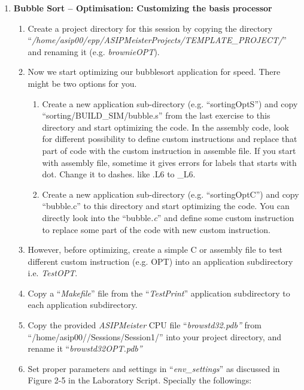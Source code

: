 \documentclass[
]{article}
\begin{document}
\begin{enumerate}
\def\labelenumi{\arabic{enumi}.}
\setcounter{enumi}{3}
\item
  \textbf{Bubble Sort -- Optimisation: Customizing the basis processor}

  \begin{enumerate}
  \def\labelenumii{\arabic{enumii}.}
  \item
    Create a project directory for this session by copying the directory
    ``\emph{/home/asip00/­epp/ASIP­Meister­Projects/TEMPLATE\_PROJECT/}''
    and renaming it (e.g. \emph{brownieOPT}).
  \item
    Now we start optimizing our bubblesort application for speed. There
    might be two options for you.

    \begin{enumerate}
    \def\labelenumiii{\arabic{enumiii}.}
    \item
      Create a new application sub-directory (e.g. ``sortingOptS'') and
      copy ``sorting/BUILD\_SIM/bubble.s'' from the last exercise to
      this directory and start optimizing the code. In the assembly
      code, look for different possibility to define custom instructions
      and replace that part of code with the custom instruction in
      assemble file. If you start with assembly file, sometime it gives
      errors for labels that starts with dot. Change it to dashes. like
      .L6 to \_L6.
    \item
      Create a new application sub-directory (e.g. ``sortingOptC'') and
      copy ``bubble.c'' to this directory and start optimizing the code.
      You can directly look into the ``bubble\emph{.c}'' and define some
      custom instruction to replace some part of the code with new
      custom instruction.
    \end{enumerate}
  \item
    However, before optimizing, create a simple C or assembly file to
    test different custom instruction (e.g. OPT) into an application
    subdirectory i.e. \emph{TestOPT}.
  \item
    Copy a ``\emph{Makefile}'' file from the ``\emph{TestPrint}''
    application subdirectory to each application subdirectory.
  \item
    Copy the provided \emph{ASIPMeister} CPU file
    ``\emph{browstd32.pdb''} from ``/home/asip00//Sessions/Session1/''
    into your project directory, and rename it
    ``\emph{browstd32OPT.pdb''}
  \item
    Set proper parameters and settings in ``\emph{env\_settings}'' as
    discussed in Figure 2-5 in the Laboratory Script. Specially the
    followings:
  \end{enumerate}
\end{enumerate}
\end{document}
